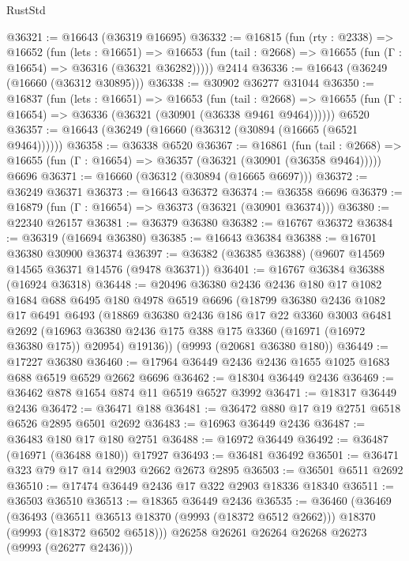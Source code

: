 \begin{lexlean}{RustStd}
\begin{coremodule}
@36321 := @16643 (@36319 @16695)
@36332 := @16815
    (fun (rty : @2338) =>
    @16652
      (fun (lets : @16651) =>
      @16653 (fun (tail : @2668) => @16655 (fun (Γ : @16654) => @36316 (@36321 @36282)))))
    @2414
@36336 := @16643 (@36249 (@16660 (@36312 @30895)))
@36338 := @30902 @36277 @31044
@36350 := @16837
    (fun (lets : @16651) =>
    @16653
      (fun (tail : @2668) =>
      @16655 (fun (Γ : @16654) => @36336 (@36321 (@30901 (@36338 @9461 @9464))))))
    @6520
@36357 := @16643 (@36249 (@16660 (@36312 (@30894 (@16665 (@6521 @9464))))))
@36358 := @36338 @6520
@36367 := @16861
    (fun (tail : @2668) => @16655 (fun (Γ : @16654) => @36357 (@36321 (@30901 (@36358 @9464)))))
    @6696
@36371 := @16660 (@36312 (@30894 (@16665 @6697)))
@36372 := @36249 @36371
@36373 := @16643 @36372
@36374 := @36358 @6696
@36379 := @16879 (fun (Γ : @16654) => @36373 (@36321 (@30901 @36374)))
@36380 := @22340 @26157
@36381 := @36379 @36380
@36382 := @16767 @36372
@36384 := @36319 (@16694 @36380)
@36385 := @16643 @36384
@36388 := @16701 @36380 @30900 @36374
@36397 := @36382 (@36385 @36388) (@9607 @14569 @14565 @36371 @14576 (@9478 @36371))
@36401 := @16767 @36384 @36388 (@16924 @36318)
@36448 := @20496
    @36380
    @2436
    @2436
    @180
    @17
    @1082
    @1684
    @688
    @6495
    @180
    @4978
    @6519
    @6696
    (@18799
      @36380
      @2436
      @1082
      @17
      @6491
      @6493
      (@18869
        @36380
        @2436
        @186
        @17
        @22
        @3360
        @3003
        @6481
        @2692
        (@16963 @36380 @2436 @175 @388 @175 @3360 (@16971 (@16972 @36380 @175)) @20954)
        @19136))
    (@9993 (@20681 @36380 @180))
@36449 := @17227 @36380
@36460 := @17964 @36449 @2436 @2436 @1655 @1025 @1683 @688 @6519 @6529 @2662 @6696
@36462 := @18304 @36449 @2436
@36469 := @36462 @878 @1654 @874 @11 @6519 @6527 @3992
@36471 := @18317 @36449 @2436
@36472 := @36471 @188
@36481 := @36472 @880 @17 @19 @2751 @6518 @6526 @2895 @6501 @2692
@36483 := @16963 @36449 @2436
@36487 := @36483 @180 @17 @180 @2751
@36488 := @16972 @36449
@36492 := @36487 (@16971 (@36488 @180)) @17927
@36493 := @36481 @36492
@36501 := @36471 @323 @79 @17 @14 @2903 @2662 @2673 @2895
@36503 := @36501 @6511 @2692
@36510 := @17474 @36449 @2436 @17 @322 @2903 @18336 @18340
@36511 := @36503 @36510
@36513 := @18365 @36449 @2436
@36535 := @36460
    (@36469
      (@36493
        (@36511 @36513 @18370 (@9993 (@18372 @6512 @2662)))
        @18370
        (@9993 (@18372 @6502 @6518)))
      @26258
      @26261
      @26264
      @26268
      @26273
      (@9993 (@26277 @2436)))

\end{coremodule}
\end{lexlean}
